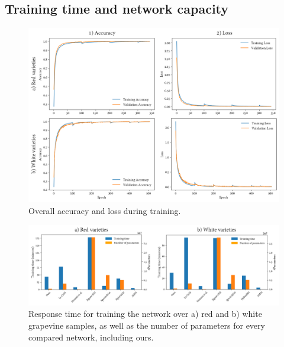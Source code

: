 \subsection{Training time and network capacity}

\begin{figure}[htb]
    \centering
    \includegraphics[width=.9\linewidth]{figs/vineyard_classification/training_history.png}
	\caption{Overall accuracy and loss during training. }
	\label{fig:training_history}
\end{figure}

\begin{figure}[htb]
    \centering
    \includegraphics[width=.85\linewidth]{figs/vineyard_classification/time_capacity_network.png}
	\caption{Response time for training the network over a) red and b) white grapevine samples, as well as the number of parameters for every compared network, including ours.  }
	\label{fig:time_capacity_networks}
\end{figure}

